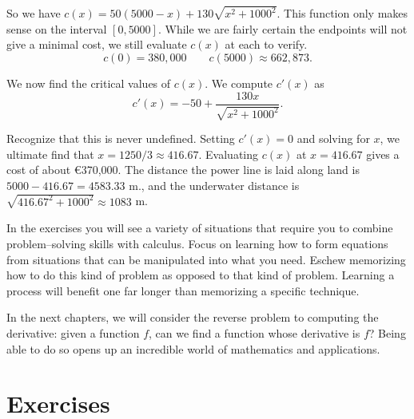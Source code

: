 \begin{example}
So we have $c(x) = 50(5000-x)+ 130\sqrt{x^2+1000^2}$. This function only makes sense on the interval $[0,5000]$. While we are fairly certain the endpoints will not give a minimal cost, we still evaluate $c(x)$ at each to verify.
$$c(0) = 380,000 \quad\quad c(5000) \approx 662,873.$$

We now find the critical values of $c(x)$. We compute $c'(x)$ as 
$$c'(x) = -50+\frac{130x}{\sqrt{x^2+1000^2}}.$$

Recognize that this is never undefined. Setting $c'(x)=0$ and solving for $x$, we ultimate find that $x=1250/3\approx 416.67$.
Evaluating $c(x)$ at $x=416.67$ gives a cost of about \euro370,000. The distance the power line is laid along land is $5000-416.67 = 4583.33$ m., and the underwater distance is $\sqrt{416.67^2+1000^2} \approx 1083$ m.
\end{example}

In the exercises you will see a variety of situations that require you to combine problem--solving skills with calculus. Focus on  learning how to form equations from situations that can be manipulated into what you need. Eschew memorizing how to do this kind of problem as opposed to that kind of problem. Learning a process will benefit one far longer than memorizing a specific technique.

\fi

In the next chapters, we will consider the reverse problem to computing the derivative: given a function $f$, can we find a function whose derivative is $f$? Being able to do so opens up an incredible world of mathematics and applications.


\newpage
\section{Exercises}

\renewcommand{\ExerciseListName}{Assignement}

\subsection*{}

